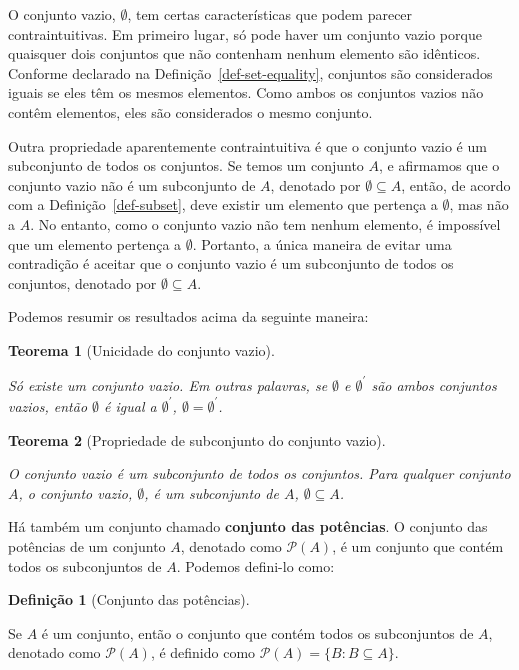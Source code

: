 \documentclass[
  letterpaper,
]{book}
\theoremstyle{plain}
\newtheorem{theorem}{Teorema}[chapter]
\theoremstyle{definition}
\newtheorem{definition}{Definição}[chapter]
\theoremstyle{remark}
\begin{document}
O conjunto vazio, \(\emptyset\), tem certas características que podem
parecer contraintuitivas. Em primeiro lugar, só pode haver um conjunto
vazio porque quaisquer dois conjuntos que não contenham nenhum elemento
são idênticos. Conforme declarado na Definição~\ref{def-set-equality},
conjuntos são considerados iguais se eles têm os mesmos elementos. Como
ambos os conjuntos vazios não contêm elementos, eles são considerados o
mesmo conjunto.

Outra propriedade aparentemente contraintuitiva é que o conjunto vazio é
um subconjunto de todos os conjuntos. Se temos um conjunto \(A\), e
afirmamos que o conjunto vazio não é um subconjunto de \(A\), denotado
por \(\emptyset \subseteq A\), então, de acordo com a
Definição~\ref{def-subset}, deve existir um elemento que pertença a
\(\emptyset\), mas não a \(A\). No entanto, como o conjunto vazio não
tem nenhum elemento, é impossível que um elemento pertença a
\(\emptyset\). Portanto, a única maneira de evitar uma contradição é
aceitar que o conjunto vazio é um subconjunto de todos os conjuntos,
denotado por \(\emptyset \subseteq A\).

Podemos resumir os resultados acima da seguinte maneira:

\begin{theorem}[Unicidade do conjunto
vazio]\protect\hypertarget{thm-empty-set-uniqueness}{}\label{thm-empty-set-uniqueness}

Só existe um conjunto vazio. Em outras palavras, se \(\emptyset\) e
\(\emptyset^{'}\) são ambos conjuntos vazios, então \(\emptyset\) é
igual a \(\emptyset^{'}\), \(\emptyset = \emptyset^{'}\).

\end{theorem}

\begin{theorem}[Propriedade de subconjunto do conjunto
vazio]\protect\hypertarget{thm-empty-set-subset}{}\label{thm-empty-set-subset}

O conjunto vazio é um subconjunto de todos os conjuntos. Para qualquer
conjunto \(A\), o conjunto vazio, \(\emptyset\), é um subconjunto de
\(A\), \(\emptyset \subseteq A\).

\end{theorem}

Há também um conjunto chamado \textbf{conjunto das potências}. O
conjunto das potências de um conjunto \(A\), denotado como
\(\mathcal{P}(A)\), é um conjunto que contém todos os subconjuntos de
\(A\). Podemos defini-lo como:

\begin{definition}[Conjunto das
potências]\protect\hypertarget{def-power-set}{}\label{def-power-set}

Se \(A\) é um conjunto, então o conjunto que contém todos os
subconjuntos de \(A\), denotado como \(\mathcal{P}(A)\), é definido como
\(\mathcal{P}(A) = \{ B: B \subseteq A \}\).

\end{definition}
\end{document}
